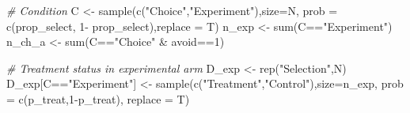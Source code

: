 \documentclass[
]{article}
\newenvironment{Shaded}{\begin{snugshade}}{\end{snugshade}}
\newcommand{\AttributeTok}[1]{\textcolor[rgb]{0.77,0.63,0.00}{#1}}
\newcommand{\CommentTok}[1]{\textcolor[rgb]{0.56,0.35,0.01}{\textit{#1}}}
\newcommand{\DecValTok}[1]{\textcolor[rgb]{0.00,0.00,0.81}{#1}}
\newcommand{\FunctionTok}[1]{\textcolor[rgb]{0.00,0.00,0.00}{#1}}
\newcommand{\NormalTok}[1]{#1}
\newcommand{\OtherTok}[1]{\textcolor[rgb]{0.56,0.35,0.01}{#1}}
\newcommand{\SpecialCharTok}[1]{\textcolor[rgb]{0.00,0.00,0.00}{#1}}
\newcommand{\StringTok}[1]{\textcolor[rgb]{0.31,0.60,0.02}{#1}}
\begin{document}
\begin{Shaded}
\begin{Highlighting}[]
  \CommentTok{\# Condition}
\NormalTok{  C }\OtherTok{\textless{}{-}} \FunctionTok{sample}\NormalTok{(}\FunctionTok{c}\NormalTok{(}\StringTok{"Choice"}\NormalTok{,}\StringTok{"Experiment"}\NormalTok{),}\AttributeTok{size=}\NormalTok{N,}
              \AttributeTok{prob =} \FunctionTok{c}\NormalTok{(prop\_select, }\DecValTok{1}\SpecialCharTok{{-}}\NormalTok{ prop\_select),}\AttributeTok{replace =}\NormalTok{ T)}
\NormalTok{  n\_exp }\OtherTok{\textless{}{-}} \FunctionTok{sum}\NormalTok{(C}\SpecialCharTok{==}\StringTok{"Experiment"}\NormalTok{)}
\NormalTok{  n\_ch\_a }\OtherTok{\textless{}{-}} \FunctionTok{sum}\NormalTok{(C}\SpecialCharTok{==}\StringTok{"Choice"} \SpecialCharTok{\&}\NormalTok{ avoid}\SpecialCharTok{==}\DecValTok{1}\NormalTok{)}
  
  \CommentTok{\# Treatment status in experimental arm}
\NormalTok{  D\_exp }\OtherTok{\textless{}{-}} \FunctionTok{rep}\NormalTok{(}\StringTok{"Selection"}\NormalTok{,N)}
\NormalTok{  D\_exp[C}\SpecialCharTok{==}\StringTok{"Experiment"}\NormalTok{] }\OtherTok{\textless{}{-}} \FunctionTok{sample}\NormalTok{(}\FunctionTok{c}\NormalTok{(}\StringTok{"Treatment"}\NormalTok{,}\StringTok{"Control"}\NormalTok{),}\AttributeTok{size=}\NormalTok{n\_exp,}
                                   \AttributeTok{prob =} \FunctionTok{c}\NormalTok{(p\_treat,}\DecValTok{1}\SpecialCharTok{{-}}\NormalTok{p\_treat), }\AttributeTok{replace =}\NormalTok{ T)}
  

\end{Highlighting}
\end{Shaded}
\end{document}
